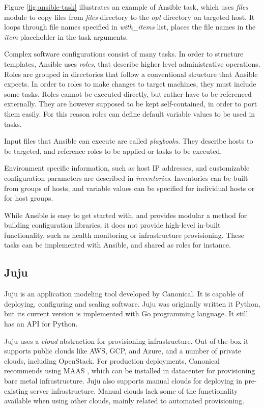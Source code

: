 \documentclass[officiallayout]{tktla}
\begin{document}
Figure \ref{fig:ansible-task} illustrates an example of Ansible task, which
uses \textit{files} module to copy files from \textit{files} directory to the
\textit{opt} directory on targeted host. It loops through file names specified
in \textit{with\_items} list, places the file names in the \textit{item}
placeholder in the task arguments.

Complex software configurations consist of many tasks. In order to structure
templates, Ansible uses \textit{roles}, that describe higher level
administrative operations. Roles are grouped in directories that follow a
conventional structure that Ansible expects. In order to roles to make changes
to target machines, they must include some tasks. Roles cannot be executed
directly, but rather have to be referenced externally. They are however
supposed to be kept self-contained, in order to port them easily. For this
reason roles can define default variable values to be used in tasks.

Input files that Ansible can execute are called \textit{playbooks}. They
describe hosts to be targeted, and reference roles to be applied or tasks to be
executed.

Environment specific information, such as host IP addresses, and customizable
configuration parameters are described in \textit{inventories}. Inventories can
be built from groups of hosts, and variable values can be specified for
individual hosts or for host groups.

While Ansible is easy to get started with, and provides modular a method for
building configuration libraries, it does not provide high-level in-built
functionality, such as health monitoring or infrastructure provisioning. These
tasks can be implemented with Ansible, and shared as roles for instance.

\subsection{Juju}

Juju \cite{juju} is an application modeling tool developed by Canonical. It is
capable of deploying, configuring and scaling software. Juju was originally
written it Python, but its current version is implemented with Go programming
language. It still has an API for Python.

Juju uses a \textit{cloud} abstraction for provisioning infrastructure.
Out-of-the-box it supports public clouds like AWS, GCP, and Azure, and a number
of private clouds, including OpenStack. For production deployments, Canonical
recommends using MAAS \cite{maas}, which can be installed in datacenter for
provisioning bare metal infrastructure. Juju also supports manual clouds for
deploying in pre-existing server infrastructure. Manual clouds lack some of the
functionality available when using other clouds, mainly related to automated
provisioning.
\end{document}
